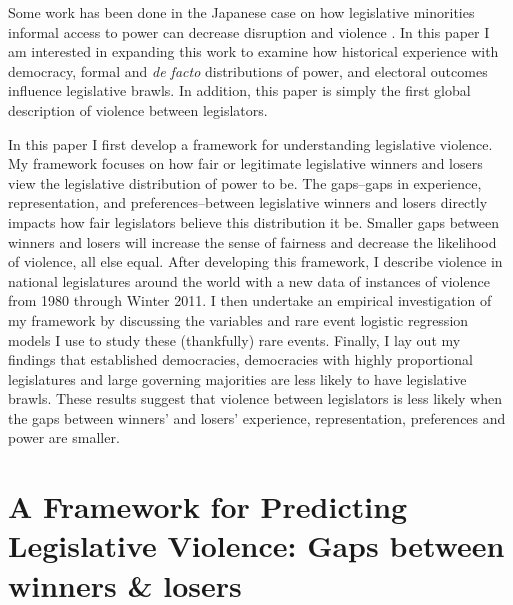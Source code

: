 \documentclass[a4paper]{article}\usepackage{graphicx, color}
\begin{document}
Some work has been done in the Japanese case on how legislative minorities informal access to power can decrease disruption and violence \cite{Wolfe2004}. In this paper I am interested in expanding this work to examine how historical experience with democracy, formal and \emph{de facto} distributions of power, and electoral outcomes influence legislative brawls. In addition, this paper is simply the first global description of violence between legislators. 

In this paper I first develop a framework for understanding legislative violence. My framework focuses on how fair or legitimate legislative winners and losers view the legislative distribution of power to be. The gaps--gaps in experience, representation, and preferences--between legislative winners and losers directly impacts how fair legislators believe this distribution it be. Smaller gaps between winners and losers will increase the sense of fairness and decrease the likelihood of violence, all else equal. After developing this framework, I describe violence in national legislatures around the world with a new data of instances of violence from 1980 through Winter 2011. I then undertake an empirical investigation of my framework by discussing the variables and rare event logistic regression models \citep{KingRareEvents2001, KingRareEventsPA2001} I use to study these (thankfully) rare events. Finally, I lay out my findings that established democracies, democracies with highly proportional legislatures and large governing majorities are less likely to have legislative brawls. These results suggest that violence between legislators is less likely when the gaps between winners' and losers' experience, representation, preferences and power are smaller.


\section{A Framework for Predicting Legislative Violence: Gaps between winners \& losers}
\end{document}
